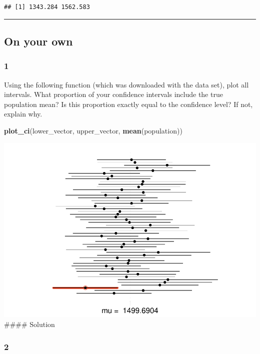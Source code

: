 \documentclass[]{article}
\newenvironment{Shaded}{\begin{snugshade}}{\end{snugshade}}
\newcommand{\KeywordTok}[1]{\textcolor[rgb]{0.13,0.29,0.53}{\textbf{#1}}}
\newcommand{\NormalTok}[1]{#1}
\begin{document}
\begin{verbatim}
## [1] 1343.284 1562.583
\end{verbatim}

\begin{center}\rule{0.5\linewidth}{\linethickness}\end{center}

\subsection{On your own}\label{on-your-own}

\subsubsection{1}\label{section}

Using the following function (which was downloaded with the data set),
plot all intervals. What proportion of your confidence intervals include
the true population mean? Is this proportion exactly equal to the
confidence level? If not, explain why.

\begin{Shaded}
\begin{Highlighting}[]
\KeywordTok{plot_ci}\NormalTok{(lower_vector, upper_vector, }\KeywordTok{mean}\NormalTok{(population))}
\end{Highlighting}
\end{Shaded}

\includegraphics{DATA_606_Lab_4b_files/figure-latex/plot-ci-1.pdf}
\#\#\#\# Solution

\subsubsection{2}\label{section-1}
\end{document}
